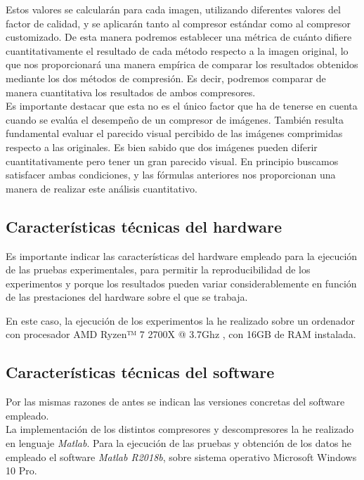 \documentclass[12pt,a4paper]{article}
\begin{document}
Estos valores se calcularán para cada imagen, utilizando diferentes valores del factor de calidad, y se aplicarán tanto al compresor estándar como al compresor customizado.  De esta manera podremos establecer una métrica de cuánto difiere cuantitativamente el resultado de cada método respecto a la imagen original, lo que nos proporcionará una manera empírica de comparar los resultados obtenidos mediante los dos métodos de compresión. Es decir, podremos comparar de manera cuantitativa los resultados de ambos compresores.\\

Es importante destacar que esta no es el único factor que ha de tenerse en cuenta cuando se evalúa el desempeño de un compresor de imágenes. También resulta fundamental evaluar el parecido visual percibido de las imágenes comprimidas respecto a las originales. Es bien sabido que dos imágenes pueden diferir cuantitativamente pero tener un gran parecido visual. En principio buscamos satisfacer ambas condiciones, y las fórmulas anteriores nos proporcionan una manera de realizar este análisis cuantitativo.


\subsection{Características técnicas del hardware}
Es importante indicar las características del hardware empleado para la ejecución de las pruebas experimentales, para permitir la reproducibilidad de los experimentos y porque los resultados pueden variar considerablemente en función de las prestaciones del hardware sobre el que se trabaja.\\


En este caso, la ejecución de los experimentos la he realizado sobre un ordenador con procesador AMD Ryzen™ 7 2700X @ 3.7Ghz , con 16GB de RAM instalada.


\subsection{Características técnicas del software}
Por las mismas razones de antes se indican las versiones concretas del software empleado.\\

La implementación de los distintos compresores y descompresores la he realizado en lenguaje \textit{Matlab}. Para la ejecución de las pruebas y obtención de los datos he empleado el software \textit{Matlab R2018b}, sobre sistema operativo Microsoft Windows 10 Pro.  
\end{document}
